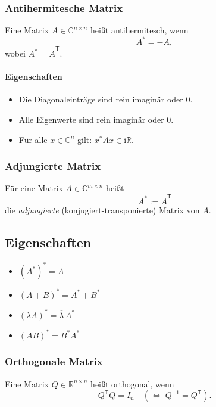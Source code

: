 \documentclass[10pt,a4paper,twocolumn]{article}
\begin{document}
	\subsubsection*{Antihermitesche Matrix}
	
	Eine Matrix $A \in \mathbb{C}^{n\times n}$ heißt antihermitesch, wenn
	\[
	A^{\mathsf *} = -A,
	\]
	wobei $A^{\mathsf *} = \overline{A}^{\mathsf T}$.
	
	\paragraph*{Eigenschaften}
	\begin{itemize}
		\item Die Diagonaleinträge sind rein imaginär oder $0$.
		\item Alle Eigenwerte sind rein imaginär oder $0$.
		\item Für alle $x \in \mathbb{C}^n$ gilt: $x^{\mathsf *} A x \in \mathrm{i}\mathbb{R}$.
	\end{itemize}
	
	\subsubsection*{Adjungierte Matrix}
	
	Für eine Matrix $A \in \mathbb{C}^{m\times n}$ heißt
	\[
	A^{\mathsf *} := \overline{A}^{\mathsf T}
	\]
	die \emph{adjungierte} (konjugiert-transponierte) Matrix von $A$.
	
	\subsection*{Eigenschaften}
	\begin{itemize}
		\item $(A^{\mathsf *})^{\mathsf *} = A$
		\item $(A+B)^{\mathsf *} = A^{\mathsf *} + B^{\mathsf *}$
		\item $(\lambda A)^{\mathsf *} = \overline{\lambda}\, A^{\mathsf *}$
		\item $(AB)^{\mathsf *} = B^{\mathsf *} A^{\mathsf *}$
	\end{itemize}
	
	\subsubsection*{Orthogonale Matrix}
	
	Eine Matrix $Q \in \mathbb{R}^{n\times n}$ heißt orthogonal, wenn
	\[
	Q^{\mathsf T} Q = I_n
	\quad (\Leftrightarrow\; Q^{-1} = Q^{\mathsf T}).
	\]
	
\end{document}
